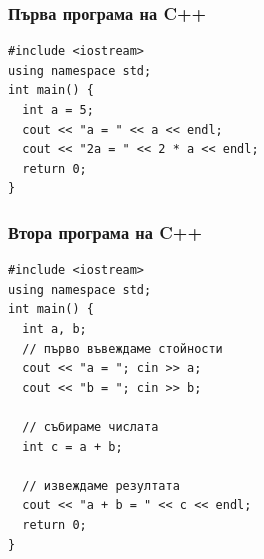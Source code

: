 \documentclass{beamer}
\begin{document}
\begin{frame}[fragile]
  \frametitle{Първа програма на C++}
  \begin{lstlisting}
#include <iostream>
using namespace std;
int main() {
  int a = 5;
  cout << "a = " << a << endl;
  cout << "2a = " << 2 * a << endl;
  return 0;
}
  \end{lstlisting}
\end{frame}

\begin{frame}[fragile]
  \frametitle{Втора програма на C++}
\begin{lstlisting}
#include <iostream>
using namespace std;
int main() {
  int a, b;
  // първо въвеждаме стойности
  cout << "a = "; cin >> a;
  cout << "b = "; cin >> b;

  // събираме числата
  int c = a + b;

  // извеждаме резултата
  cout << "a + b = " << c << endl;
  return 0;
}
\end{lstlisting}
\end{frame}
\end{document}
